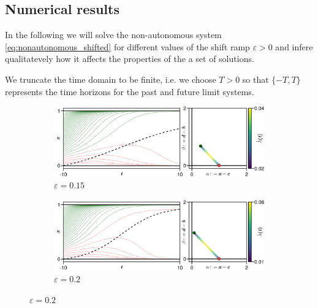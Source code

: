\documentclass[../main.tex]{subfiles}
\begin{document}
\subsection{Numerical results}\label{subsec:results}

In the following we will solve the non-autonomous system \eqref{eq:nonautonomous_shifted} for different values of the shift ramp $\varepsilon>0$ and infere qualitatevely how it affects the properties of the a set of solutions. 

We truncate the time domain to be finite, i.e. we choose $T>0$ so that $\{-T,T\}$ represents the time horizons for the past and future limit systems.

\begin{figure}[H]
    \begin{subfigure}[b]{0.495\textwidth}
        \centering 
        \includegraphics[keepaspectratio, width = \linewidth]{../figures/fig:nonautonomous_1.png}
        \caption{$\varepsilon = 0.15$}
        \label{fig:nonautonomous_1}
    \end{subfigure}
    \hfill
    \begin{subfigure}[b]{0.495\textwidth}
        \centering 
        \includegraphics[keepaspectratio, width = \linewidth]{../figures/fig:nonautonomous_2.png}
        \caption{$\varepsilon = 0.2$}
        \label{fig:nonautonomous_2}
    \end{subfigure}


\end{figure}
\end{document}
